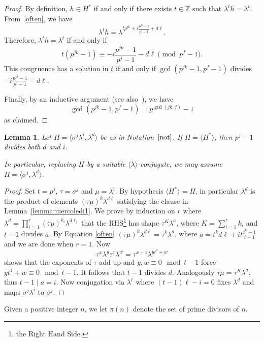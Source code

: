 \documentclass{amsart}
\newtheorem{lemma}[theorem]{Lemma}
\begin{document}
\begin{proof}
By definition, $h \in H^\ast$ if and only if there exists $t \in \mathbb{Z}$ such that $\lambda^t h = \lambda^t$. From~\eqref{often},
we have
$$\lambda^t h = \lambda^{t p^{jk} + i\frac{p^{jk} - 1}{p^j - 1} + d\ell}.$$
Therefore, $\lambda^t h = \lambda^t$ if and only if
$$t(p^{jk} - 1) \equiv -i\frac{p^{jk} - 1}{p^j - 1} - d\ell \pmod{p^f - 1}.$$
This congruence has a solution in $t$ if and only if $\gcd(p^{jk} - 1, p^f - 1)$ divides $-i\frac{p^{jk} - 1}{p^j - 1} - d\ell$.

Finally, by an inductive argument (see also~\cite[Lemma~2.2~(1)]{libro}), we have
$$\gcd(p^{jk} - 1, p^f - 1) = p^{\gcd(jk,f)} - 1$$
as claimed.
\end{proof}

\begin{lemma}\label{lemma:mercoledi2}
Let $H = \langle \sigma^j \lambda^i, \lambda^d \rangle$ be as in Notation~$\ref{not}$. If $H = \langle H^\ast \rangle$, then $p^j - 1$ divides both $d$ and $i$.

In particular, replacing $H$ by a suitable $\langle \lambda \rangle$-conjugate, we may assume $H = \langle \sigma^j,\lambda^d \rangle$.
\end{lemma}
\begin{proof}
Set $t=p^j$, $\tau=\sigma^j$ and $\mu=\lambda^i$. By hypothesis $\langle H^*\rangle=H$, in particular $\lambda^d$ is the
  product of elements $(\tau\mu)^k\lambda^{d\ell}$ satisfying the clause in Lemma~\ref{lemma:mercoledi1}.
  We prove by induction on $r$ where $\lambda^d=\prod_{i=1}^{r}(\tau\mu)^{k_i}\lambda^{d\ell_i}$ that
  the RHS\footnote{the Right Hand Side.} has shape $\tau^K\lambda^a$, where $K=\sum_{i=1}^{r}k_i$ and $t-1$ divides $a$.
 By Equation \ref{often} $(\tau\mu)^k\lambda^{d\ell}=\tau^k\lambda^a$, where $a=t^kd\ell+it\frac{t^k-1}{t-1}$ and we are done when $r=1$.
 Now 
 $$\tau^x\lambda^y\tau^z\lambda^w=\tau^{x+z}\lambda^{yt^z+w}$$
 shows that the exponents of $\tau$ add up and $y,w\equiv 0 \mod t-1$ force $yt^z+w\equiv 0\mod t-1$. It follows that $t-1$ divides $d$.
 Analogously $\tau\mu=\tau^K\lambda^a$, thus $t-1\mid a=i$. Now conjugation via $\lambda^\ell$ where $(t-1)\ell-i=0$ fixes $\lambda^d$ and maps $\sigma^j\lambda^i$ to $\sigma^j$.
\end{proof}

Given a positive integer $n$, we let $\pi(n)$ denote the set of prime divisors of $n$.
\end{document}
